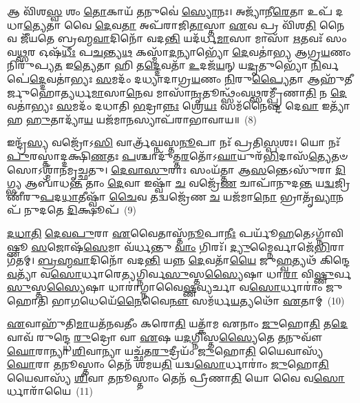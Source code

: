 𑌆 𑌵𑌿᳴𑌶\-\ul{𑌸𑍍𑌵} 𑌶𑌂 \ul{𑌤𑍋}\-𑌕𑌾𑌯᳴ \ul{𑌤}\-𑌨𑍁𑌵𑍇॑ \ul{𑌸𑍍𑌯𑍋}\-𑌨𑌃। 𑌅𑌜𑍍𑌯𑌾᳴𑌨𑍀\-\ul{𑌰𑍇}\-𑌤𑌾 𑌉𑌪᳴ 𑌦𑌧𑌾\-\ul{𑌤𑍍𑌯𑍇}\-𑌤𑌾 𑌵𑍈 \ul{𑌦𑍇}\-𑌵\-\ul{𑌤𑌾} 𑌅𑌪᳴𑌰𑌾𑌜𑌿\-\ul{𑌤𑌾}\-𑌸𑍍𑌤𑌾 \ul{𑌏}\-𑌵 𑌪𑍍𑌰 𑌵𑌿᳴𑌶\-\ul{𑌤𑌿} 𑌨𑍈𑌵 𑌜𑍀᳴𑌯𑌤𑍇 𑌬𑍍𑌰𑌹𑍍𑌮\-\ul{𑌵𑌾}\-𑌦𑌿𑌨𑍋᳴ 𑌵𑌦\-\ul{𑌨𑍍𑌤𑌿} 𑌯𑌦᳴𑌰𑍍𑌧\-\ul{𑌮𑌾}\-𑌸𑌾 𑌮𑌾𑌸𑌾᳴ \ul{𑌋}\-𑌤𑌵𑌃᳴ 𑌸𑌂𑌵\-\ul{𑌥𑍍𑌸}\-𑌰 𑌓𑌷᳴\-\ul{𑌧𑍀𑌃} 𑌪\-\ul{𑌚}\-𑌨𑍍𑌤𑍍𑌯\-\ul{𑌥} 𑌕𑌸𑍍𑌮𑌾᳴\-\ul{𑌦}\-𑌨𑍍𑌯𑌾𑌭𑍍𑌯𑍋᳴ \ul{𑌦𑍇}\-𑌵𑌤𑌾॑𑌭𑍍𑌯 𑌆𑌗𑍍𑌰\-\ul{𑌯}\-𑌣𑌂 𑌨𑌿𑌰𑍁᳴𑌪𑍍𑌯\-\ul{𑌤} 𑌇\-\ul{𑌤𑍍𑌯𑍇}\-𑌤𑌾 𑌹𑌿 𑌤\-\ul{𑌦𑍍𑌦𑍇}\-𑌵𑌤𑌾᳴ \ul{𑌉}\-𑌦𑌜᳴\-\ul{𑌯}\-𑌨𑍍 𑌯\-\ul{𑌦𑍃}\-𑌤𑍁𑌭𑍍𑌯𑍋᳴ \ul{𑌨𑌿}\-𑌰𑍍𑌵𑌪𑍇॑\-\ul{𑌦𑍍𑌦𑍇}\-𑌵𑌤𑌾॑𑌭𑍍𑌯𑌃 \ul{𑌸}\-𑌮𑌦𑌂᳴ 𑌦𑌧𑍍𑌯𑌾𑌦𑌾𑌗𑍍𑌰\-\ul{𑌯}\-𑌣𑌂 \ul{𑌨𑌿}\-𑌰𑍁\-\ul{𑌪𑍍𑌯𑍈}\-𑌤𑌾 𑌆𑌹𑍁᳴𑌤𑍀𑌰𑍍𑌜𑍁𑌹𑍋𑌤𑍍𑌯𑌰𑍍𑌧\-\ul{𑌮𑌾}\-𑌸𑌾\-\ul{𑌨𑍇}\-𑌵 𑌮𑌾𑌸𑌾᳴\-\ul{𑌨𑍃}\-𑌤𑍂𑌨𑍍𑌥𑍍𑌸𑌂᳴𑌵\-\ul{𑌥𑍍𑌸}\-𑌰𑌮𑍍𑌪𑍍𑌰𑍀᳴𑌣𑌾\-\ul{𑌤𑌿} 𑌨 \ul{𑌦𑍇}\-𑌵𑌤𑌾॑𑌭𑍍𑌯𑌃 \ul{𑌸}\-𑌮𑌦𑌂᳴ 𑌦𑌧𑌾𑌤𑌿 \ul{𑌭}\-𑌦𑍍𑌰𑌾\-\ul{𑌨𑍍𑌨𑌃} 𑌶𑍍𑌰𑍇\-\ul{𑌯𑌃} 𑌸𑌮᳴𑌨𑍈𑌷𑍍𑌟 𑌦𑍇\-\ul{𑌵𑌾} 𑌇𑌤𑍍𑌯𑌾᳴𑌹 \ul{𑌹𑍁}\-𑌤𑌾𑌦𑍍𑌯𑌾᳴\-\ul{𑌯} 𑌯𑌜᳴𑌮𑌾\-\ul{𑌨}\-𑌸𑍍𑌯𑌾𑌪᳴𑌰𑌾𑌭𑌾𑌵𑌾𑌯॥~(8)

{\anuvakamend[{\-\ul{𑌪𑍍𑌰𑌾}\-\-\ul{𑌜𑌾}\-\-\ul{𑌪}\-𑌤𑍍𑌯𑌾\-\ul{𑌲𑍍𑌲𑍋𑌁}\-𑌕𑌾𑌯᳴ 𑌦𑍇𑌵𑌾𑌃 𑌪𑌿𑌤𑍋 𑌦𑌧𑍍𑌯𑌾𑌦𑌾𑌗𑍍𑌰\-\ul{𑌯}\-𑌣𑌂 𑌪𑌞𑍍𑌚᳴𑌵𑌿𑍞𑌶𑌤𑌿𑌶𑍍𑌚}]}%

𑌇𑌨𑍍𑌦𑍍𑌰᳴\-\ul{𑌸𑍍𑌯} 𑌵𑌜𑍍𑌰𑍋᳴\-𑌽\-\ul{𑌸𑌿} 𑌵𑌾𑌰𑍍𑌤𑍍𑌰᳴𑌘𑍍𑌨𑌸𑍍𑌤\-\ul{𑌨𑍂}\-𑌪𑌾 𑌨𑌃᳴ 𑌪𑍍𑌰𑌤𑌿\-\ul{𑌸𑍍𑌪}\-𑌶𑌃। 𑌯𑍋 𑌨𑌃᳴ \ul{𑌪𑍁}\-𑌰𑌸𑍍𑌤𑌾॑𑌦𑍍𑌦𑌕𑍍𑌷𑌿\-\ul{𑌣}\-𑌤𑌃 \ul{𑌪}\-𑌶𑍍𑌚𑌾𑌦𑍁᳴𑌤𑍍𑌤\-\ul{𑌰}\-𑌤𑍋᳴\-𑌽\-\ul{𑌘𑌾}\-𑌯𑍁𑌰᳴\-\ul{𑌭𑌿}\-𑌦𑌾𑌸᳴\-\ul{𑌤𑍍𑌯𑍇}\-𑌤𑍞 𑌸𑍋\-𑌽𑌶𑍍𑌮𑌾᳴𑌨𑌮𑍃𑌚𑍍𑌛𑌤𑍁। \ul{𑌦𑍇}\-\-\ul{𑌵𑌾}\-\-\ul{𑌸𑍁}\-𑌰𑌾𑌃 𑌸𑌂𑌯᳴𑌤𑍍𑌤𑌾 𑌆\-\ul{𑌸}\-𑌨𑍍𑌤𑍇\-𑌽𑌸𑍁᳴𑌰𑌾 \ul{𑌦𑌿}\-𑌗𑍍𑌭𑍍𑌯 𑌆𑌬𑌾᳴𑌧\-\ul{𑌨𑍍𑌤} 𑌤𑌾𑌂 \ul{𑌦𑍇}\-𑌵𑌾 𑌇𑌷𑍍𑌵𑌾᳴ \ul{𑌚} 𑌵𑌜𑍍𑌰𑍇᳴\-\ul{𑌣} 𑌚𑌾𑌪𑌾᳴𑌨𑍁𑌦\-\ul{𑌨𑍍𑌤} 𑌯\-\ul{𑌦𑍍𑌵}\-𑌜𑍍𑌰𑌿𑌣𑍀᳴𑌰𑍁\-\ul{𑌪}\-𑌦\-\ul{𑌧𑌾}\-𑌤𑍀𑌷𑍍𑌵𑌾᳴ \ul{𑌚𑍈}\-𑌵 𑌤𑌦𑍍𑌵𑌜𑍍𑌰𑍇᳴𑌣 \ul{𑌚} 𑌯𑌜᳴𑌮𑌾\-\ul{𑌨𑍋} 𑌭𑍍𑌰𑌾𑌤𑍃᳴\-\ul{𑌵𑍍𑌯𑌾}\-𑌨𑌪᳴ 𑌨𑍁𑌦𑌤𑍇 \ul{𑌦𑌿}\-𑌕𑍍𑌷𑍂𑌪᳴~(9)

\-\ul{𑌦}\-\-\ul{𑌧𑌾}\-\-\ul{𑌤𑌿} \ul{𑌦𑍇}\-\-\ul{𑌵}\-\-\ul{𑌪𑍁}\-𑌰𑌾 \ul{𑌏}\-𑌵𑍈𑌤𑌾𑌸𑍍𑌤᳴\-\ul{𑌨𑍂}\-𑌪𑌾\-\ul{𑌨𑍀𑌃} 𑌪𑌰𑍍𑌯𑍂᳴\-\ul{𑌹}\-𑌤𑍇\-𑌽𑌗𑍍𑌨𑌾᳴𑌵𑌿𑌷𑍍𑌣𑍂 \ul{𑌸}\-𑌜𑍋𑌷᳴\-\ul{𑌸𑍇}\-𑌮𑌾 𑌵᳴𑌰𑍍𑌧𑌨𑍍𑌤𑍁 \ul{𑌵𑌾𑌂} 𑌗𑌿𑌰𑌃᳴। \ul{𑌦𑍍𑌯𑍁}\-𑌮𑍍𑌨𑍈𑌰𑍍𑌵𑌾𑌜𑍇᳴\-\ul{𑌭𑌿}\-𑌰𑌾 𑌗᳴𑌤𑌮𑍍। \ul{𑌬𑍍𑌰}\-\-\ul{𑌹𑍍𑌮}\-\-\ul{𑌵𑌾}\-𑌦𑌿𑌨𑍋᳴ 𑌵𑌦\-\ul{𑌨𑍍𑌤𑌿} 𑌯𑌨𑍍𑌨 \ul{𑌦𑍇}\-𑌵𑌤𑌾᳴\-\ul{𑌯𑍈} 𑌜𑍁\-\ul{𑌹𑍍𑌵}\-𑌤𑍍𑌯𑌥᳴ 𑌕𑌿𑌨𑍍𑌦𑍇\-\ul{𑌵}\-𑌤𑍍𑌯𑌾᳴ 𑌵\-\ul{𑌸𑍋}\-𑌰𑍍𑌧𑌾𑌰𑍇\-\ul{𑌤𑍍𑌯}\-𑌗𑍍𑌨𑌿𑌰𑍍𑌵\-\ul{𑌸𑍁}\-𑌸𑍍𑌤\-\ul{𑌸𑍍𑌯𑍈}\-𑌷𑌾 𑌧𑌾\-\ul{𑌰𑌾} 𑌵𑌿\-\ul{𑌷𑍍𑌣𑍁}\-𑌰𑍍𑌵\-\ul{𑌸𑍁}\-𑌸𑍍𑌤\-\ul{𑌸𑍍𑌯𑍈}\-𑌷𑌾 𑌧𑌾𑌰𑌾॑𑌗𑍍𑌨𑌾𑌵𑍈\-\ul{𑌷𑍍𑌣}\-𑌵𑍍𑌯𑌰𑍍𑌚𑌾 𑌵\-\ul{𑌸𑍋}\-𑌰𑍍𑌧𑌾𑌰𑌾𑌂॑ 𑌜𑍁𑌹𑍋𑌤𑌿 𑌭𑌾\-\ul{𑌗}\-𑌧𑍇𑌯𑍇᳴\-\ul{𑌨𑍈}\-𑌵𑍈\-\ul{𑌨𑍗} 𑌸𑌮᳴𑌰𑍍𑌧\-\ul{𑌯}\-𑌤𑍍𑌯𑌥𑍋᳴ \ul{𑌏}\-𑌤𑌾𑌮𑍍~(10)

\-\ul{𑌏}\-𑌵𑌾𑌹𑍁᳴𑌤𑌿\-\ul{𑌮𑌾}\-𑌯𑌤᳴𑌨𑌵𑌤𑍀𑌂 𑌕𑌰𑍋\-\ul{𑌤𑌿} 𑌯𑌤𑍍𑌕𑌾᳴𑌮 𑌏𑌨𑌾𑌂 \ul{𑌜𑍁}\-𑌹𑍋\-\ul{𑌤𑌿} 𑌤\-\ul{𑌦𑍇}\-𑌵𑌾𑌵᳴ 𑌰𑍁𑌨𑍍𑌦𑍍𑌧𑍇 \ul{𑌰𑍁}\-𑌦𑍍𑌰𑍋 𑌵𑌾 \ul{𑌏}\-𑌷 𑌯\-\ul{𑌦}\-𑌗𑍍𑌨𑌿𑌸𑍍𑌤\-\ul{𑌸𑍍𑌯𑍈}\-𑌤𑍇 \ul{𑌤}\-𑌨𑍁𑌵𑍗᳴ \ul{𑌘𑍋}\-𑌰𑌾𑌨𑍍𑌯𑌾 \ul{𑌶𑌿}\-𑌵𑌾𑌨𑍍𑌯𑌾 𑌯𑌚𑍍𑌛᳴𑌤\-\ul{𑌰𑍁}\-𑌦𑍍𑌰𑍀𑌯𑌂᳴ \ul{𑌜𑍁}\-𑌹𑍋\-\ul{𑌤𑌿} 𑌯𑍈𑌵𑌾𑌸𑍍𑌯᳴ \ul{𑌘𑍋}\-𑌰𑌾 \ul{𑌤}\-𑌨𑍂𑌸𑍍𑌤𑌾𑌂 𑌤𑍇𑌨᳴ 𑌶𑌮𑌯\-\ul{𑌤𑌿} 𑌯𑌦𑍍𑌵\-\ul{𑌸𑍋}\-𑌰𑍍𑌧𑌾𑌰𑌾𑌂॑ \ul{𑌜𑍁}\-𑌹𑍋\-\ul{𑌤𑌿} 𑌯𑍈𑌵𑌾𑌸𑍍𑌯᳴ \ul{𑌶𑌿}\-𑌵𑌾 \ul{𑌤}\-𑌨𑍂𑌸𑍍𑌤𑌾𑌂 𑌤𑍇𑌨᳴ 𑌪𑍍𑌰𑍀𑌣𑌾\-\ul{𑌤𑌿} 𑌯𑍋 𑌵𑍈 𑌵\-\ul{𑌸𑍋}\-𑌰𑍍𑌧𑌾𑌰𑌾᳴𑌯𑍈~(11)

